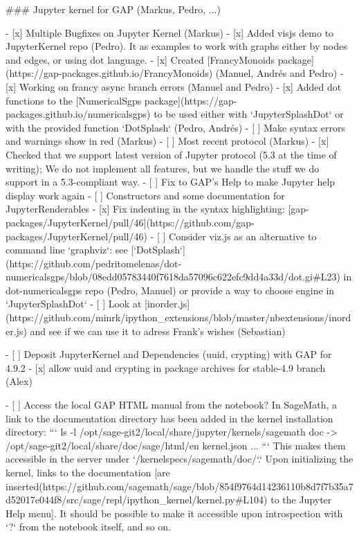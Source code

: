 \begin{Aim 1}
### Jupyter kernel for GAP (Markus, Pedro, ...)

- [x] Multiple Bugfixes on Jupyter Kernel (Markus)
- [x] Added visjs demo to JupyterKernel repo (Pedro). It as examples to work with graphs either by nodes and edges, or using dot language.
- [x] Created [FrancyMonoids package](https://gap-packages.github.io/FrancyMonoids) (Manuel, Andrés and Pedro)
- [x] Working on francy async branch errors (Manuel and Pedro) 
- [x] Added dot functions to the [NumericalSgps package](https://gap-packages.github.io/numericalsgps) to be used either with `JupyterSplashDot` or with the provided function `DotSplash` (Pedro, Andrés) 
- [ ] Make syntax errors and warnings show in red (Markus)
- [ ] Most recent protocol (Markus)
- [x] Checked that we support latest version of Jupyter protocol (5.3 at the time of writing); We do not implement all features, but we handle the stuff we do support in a 5.3-compliant way.
- [ ] Fix to GAP's Help to make Jupyter help display work again
- [ ]  Constructors and some documentation for JupyterRenderables
- [x] Fix indenting in the syntax highlighting: [gap-packages/JupyterKernel/pull/46](https://github.com/gap-packages/JupyterKernel/pull/46)
- [ ] Consider viz.js as an alternative to command line `graphviz`: see [`DotSplash`](https://github.com/pedritomelenas/dot-numericalsgps/blob/08edd05783440f7618da57096c622efc9dd4a33d/dot.gi#L23) in dot-numericalsgps repo (Pedro, Manuel) or provide a way to choose engine in `JupyterSplashDot`
- [ ] Look at [inorder.js](https://github.com/minrk/ipython_extensions/blob/master/nbextensions/inorder.js) and see if we can use it to adress Frank's wishes (Sebastian)


- [ ]  Deposit JupyterKernel and Dependencies (uuid, crypting) with GAP for 4.9.2
    - [x] allow uuid and crypting in package archives for stable-4.9 branch (Alex)

- [ ] Access the local GAP HTML manual from the notebook?
    In SageMath, a link to the documentation directory has been added in the kernel installation directory:
    ```
    ls -l /opt/sage-git2/local/share/jupyter/kernels/sagemath
    doc -> /opt/sage-git2/local/share/doc/sage/html/en
    kernel.json
    ...
    ```
    This makes them accessible in the server under `/kernelspecs/sagemath/doc/`.`
    Upon initializing the kernel, links to the documentation [are inserted(https://github.com/sagemath/sage/blob/854f9764d14236110b8d7f7b35a7d52017e044f8/src/sage/repl/ipython_kernel/kernel.py#L104) to the Jupyter Help menu]. It should be possible to make it accessible upon introspection with `?` from the notebook itself, and so on.



\end{Aim 1}
